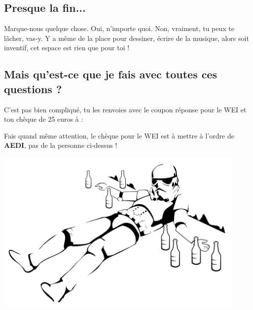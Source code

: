 \subsection*{Presque la fin...}
Marque-nous quelque chose. Oui, n'importe quoi. Non, vraiment, tu peux te
lâcher, vas-y. Y a même de la place pour dessiner, écrire de la musique, alors soit inventif, cet
espace est rien que pour toi !

\vfill

\columnbreak

\subsection{Mais qu'est-ce que je fais avec toutes ces questions ?}
C'est pas bien compliqué, tu les renvoies avec le coupon réponse pour le WEI et
ton chèque de 25 euros à :
\vspace{1em}
\adresseCoupon
\vspace{1em}


Fais quand même attention, le chèque pour le WEI est à mettre à l'ordre de \textbf{AEDI}, pas de la personne ci-dessus !

\vfill
\hspace{-5cm}
\includegraphics[height=8cm]{images/stormTrooperBourre.png}
